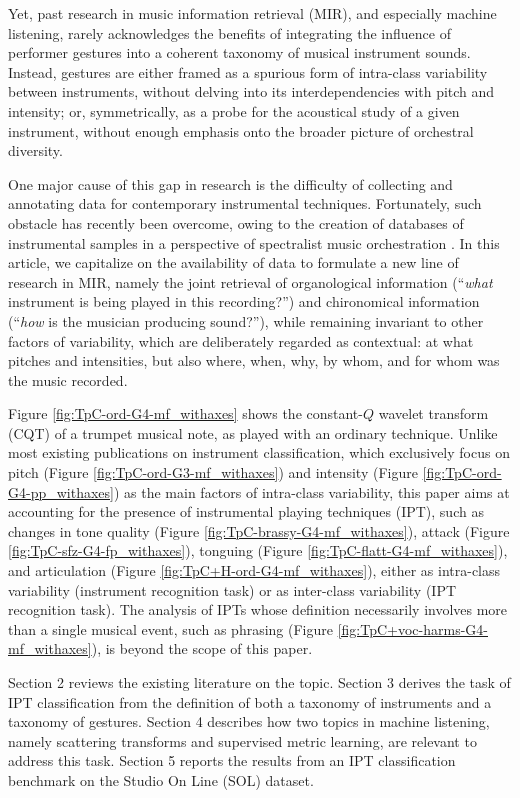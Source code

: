 \documentclass{article}
\begin{document}
Yet, past research in music information retrieval (MIR), and especially machine listening, rarely acknowledges the benefits of integrating the influence of performer gestures into a coherent taxonomy of musical instrument sounds.
Instead, gestures are either framed as a spurious form of intra-class variability between instruments, without delving into its interdependencies with pitch and intensity;
or, symmetrically, as a probe for the acoustical study of a given instrument, without enough emphasis onto the broader picture of orchestral diversity.

One major cause of this gap in research is the difficulty of collecting and annotating data for contemporary instrumental techniques.
Fortunately, such obstacle has recently been overcome, owing to the creation of databases of instrumental samples in a perspective of spectralist music orchestration \cite{maresz2013cmr}.
In this article, we capitalize on the availability of data to formulate a new line of research in MIR, namely the joint retrieval of organological information (``\emph{what} instrument is being played in this recording?'') and chironomical information (``\emph{how} is the musician producing sound?''), while remaining invariant to other factors of variability, which are deliberately regarded as contextual: at what pitches and intensities, but also where, when, why, by whom, and for whom was the music recorded.

Figure \ref{fig:TpC-ord-G4-mf_withaxes} shows the constant-$Q$ wavelet transform (CQT) of a trumpet musical note, as played with an ordinary technique.
Unlike most existing publications on instrument classification, which exclusively focus on pitch (Figure \ref{fig:TpC-ord-G3-mf_withaxes}) and intensity (Figure \ref{fig:TpC-ord-G4-pp_withaxes}) as the main factors of intra-class variability, this paper aims at accounting for the presence of instrumental playing techniques (IPT), such as changes in tone quality (Figure \ref{fig:TpC-brassy-G4-mf_withaxes}), attack (Figure \ref{fig:TpC-sfz-G4-fp_withaxes}), tonguing (Figure \ref{fig:TpC-flatt-G4-mf_withaxes}), and articulation (Figure \ref{fig:TpC+H-ord-G4-mf_withaxes}), either as intra-class variability (instrument recognition task) or as inter-class variability (IPT recognition task).
The analysis of IPTs whose definition necessarily involves more than a single musical event, such as phrasing (Figure \ref{fig:TpC+voc-harms-G4-mf_withaxes}), is beyond the scope of this paper.


Section 2 reviews the existing literature on the topic.
Section 3 derives the task of IPT classification from the definition of both a taxonomy of instruments and a taxonomy of gestures.
Section 4 describes how two topics in machine listening, namely scattering transforms and supervised metric learning, are relevant to address this task.
Section 5 reports the results from an IPT classification benchmark on the Studio On Line (SOL) dataset.
\end{document}

